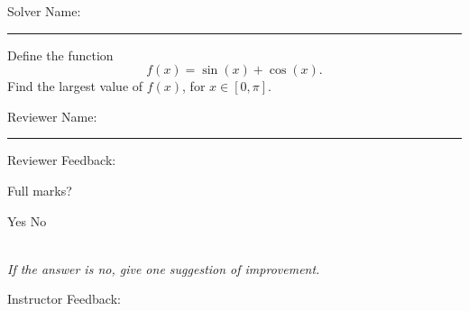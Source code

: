 \documentclass[12pt]{exam}
\begin{document}
\pagestyle{headandfoot}
\firstpageheadrule

Solver Name:\enspace\rule{5cm}{0.8pt}

\begin{questions}
\question

Define the function
\[f(x)=\sin(x)+\cos(x).\]
Find the largest value of $f(x)$, for $x\in[0,\pi]$.

\end{questions}

Reviewer Name:\enspace\rule{5cm}{0.8pt}

\begin{questions}
\question
Reviewer Feedback:

Full marks? \begin{oneparcheckboxes}
\choice Yes
\choice No
\end{oneparcheckboxes}\\
\textit{If the answer is no, give one suggestion of improvement.}

\question

Instructor Feedback:



\end{questions}
\end{document}
